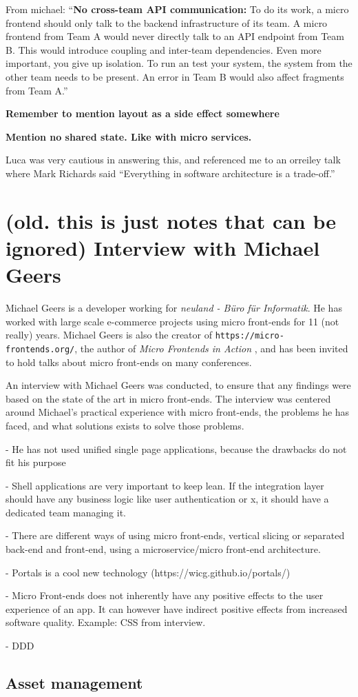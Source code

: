 From michael: ``\textbf{No cross-team API communication:} To do its work, a micro frontend should only talk to the backend infrastructure of its team. A micro frontend from Team A would never directly talk to an API endpoint from Team B. This would introduce coupling and inter-team dependencies. Even more important, you give up isolation. To run an test your system, the system from the other team needs to be present. An error in Team B would also affect fragments from Team A.''

\textbf{Remember to mention layout as a side effect somewhere}

\textbf{Mention no shared state. Like with micro services.}

Luca was very cautious in answering this, and referenced me to an orreiley talk where Mark Richards said ``Everything in software architecture is a trade-off.'' 

\section{(old. this is just notes that can be ignored) Interview with Michael Geers}
Michael Geers is a developer working for \textit{neuland - Büro für Informatik}. He has worked with large scale e-commerce projects using micro front-ends for 11 (not really) years. Michael Geers is also the creator of \texttt{https://micro-frontends.org/}, the author of \textit{Micro Frontends in Action} \cite{Geers2020}, and has been invited to hold talks about micro front-ends on many conferences.

An interview with Michael Geers was conducted, to ensure that any findings were based on the state of the art in micro front-ends. The interview was centered around Michael's practical experience with micro front-ends, the problems he has faced, and what solutions exists to solve those problems.

- He has not used unified single page applications, because the drawbacks do not fit his purpose

- Shell applications are very important to keep lean. If the integration layer should have any business logic like user authentication or x, it should have a dedicated team managing it.

- There are different ways of using micro front-ends, vertical slicing or separated back-end and front-end, using a microservice/micro front-end architecture.

- Portals is a cool new technology (https://wicg.github.io/portals/)

- Micro Front-ends does not inherently have any positive effects to the user experience of an app. It can however have indirect positive effects from increased software quality. Example: CSS from interview.

- DDD

\subsection{Asset management}